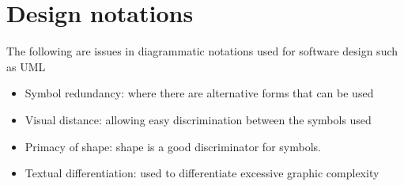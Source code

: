 \documentclass{article}[18pt]
\begin{document}
\section{Design notations}
The following are issues in diagrammatic notations used for software design such as UML
\begin{itemize}
	\item Symbol redundancy: where there are alternative forms that can be used
	\item Visual distance: allowing easy discrimination between the symbols used
	\item Primacy of shape: shape is a good discriminator for symbols.
	\item Textual differentiation: used to differentiate excessive graphic complexity
\end{itemize}
\end{document}
